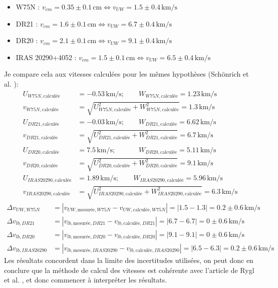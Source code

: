 \documentclass[a4paper, 11pt]{article}
\begin{document}
	\begin{itemize}
		\item W75N : $v_{cm} = 0.35 \pm 0.1 \, \mathrm{cm} \Leftrightarrow v_{UW} = 1.5 \pm 0.4 \, \mathrm{km/s}$
		\item DR21 : $v_{cm} = 1.6 \pm 0.1 \, \mathrm{cm} \Leftrightarrow v_{UW} = 6.7 \pm 0.4 \, \mathrm{km/s}$
		\item DR20 : $v_{cm} = 2.1 \pm 0.1 \, \mathrm{cm} \Leftrightarrow v_{UW} = 9.1 \pm 0.4 \, \mathrm{km/s}$
		\item IRAS 20290+4052 : $v_{cm} = 1.5 \pm 0.1 \, \mathrm{cm} \Leftrightarrow v_{UW} = 6.5 \pm 0.4 \, \mathrm{km/s}$
	\end{itemize}
	Je compare cela aux vitesses calculées pour les mêmes hypothèses (Schönrich et al. \cite{schonrich2010}):
	\begin{align*}
		U_{W75N, \text{calculée}} &= -0.53 \, \text{km/s}; \qquad W_{W75N, \text{calculée}} = 1.23 \, \text{km/s} \\
		v_{W75N, \text{calculée}} &= \sqrt{ U_{W75N, \text{calculée}}^2 + W_{W75N, \text{calculée}}^2 } = 1.3 \, \text{km/s} \\[0.5cm]
		U_{DR21, \text{calculée}} &= -0.03 \, \text{km/s}; \qquad W_{DR21, \text{calculée}} = 6.62 \, \text{km/s} \\
		v_{DR21, \text{calculée}} &= \sqrt{ U_{DR21, \text{calculée}}^2 + W_{DR21, \text{calculée}}^2 } = 6.7 \, \text{km/s} \\[0.5cm]
		U_{DR20, \text{calculée}} &= 7.5 \, \text{km/s}; \qquad\quad\; W_{DR20, \text{calculée}} = 5.11 \, \text{km/s} \\
		v_{DR20, \text{calculée}} &= \sqrt{ U_{DR20, \text{calculée}}^2 + W_{DR20, \text{calculée}}^2 } = 9.1 \, \text{km/s} \\[0.5cm]
		U_{IRAS20290, \text{calculée}} &= 1.89 \, \text{km/s}; \qquad W_{IRAS20290, \text{calculée}} = 5.96 \, \text{km/s} \\
		v_{IRAS20290, \text{calculée}} &= \sqrt{ U_{IRAS20290, \text{calculée}}^2 + W_{IRAS20290, \text{calculée}}^2 } = 6.3 \, \text{km/s}
	\end{align*}
	\begin{align*}
		\Delta v_{UW, W75N} &= |v_{UW, \text{mesurée}, W75N} - v_{UW, \text{calculée}, W75N}| = |1.5 - 1.3| = 0.2 \pm 0.6 \, \text{km/s} \\[0.2cm]
		\Delta v_{lb, DR21} &= |v_{lb, \text{mesurée}, DR21} - v_{lb, \text{calculée}, DR21}| = |6.7 - 6.7| = 0 \pm 0.6 \, \text{km/s} \\[0.2cm]
		\Delta v_{lb, DR20} &= |v_{lb, \text{mesurée}, DR20} - v_{lb, \text{calculée}, DR20}| = |9.1 - 9.1| = 0 \pm 0.6 \, \text{km/s} \\[0.2cm]
		\Delta v_{lb, IRAS20290} &= |v_{lb, \text{mesurée}, IRAS20290} - v_{lb, \text{calculée}, IRAS20290}| = |6.5 - 6.3| = 0.2 \pm 0.6 \, \text{km/s}
	\end{align*}
	Les résultats concordent dans la limite des incertitudes utilisées, on peut donc en conclure que la méthode de calcul des vitesses est cohérente avec l’article de Rygl et al. \cite{rygl2012}, et donc commencer à interpréter les résultats.
	
\end{document}
